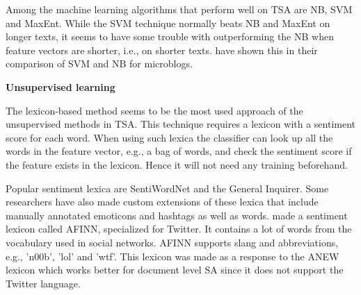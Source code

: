 Among the machine learning algorithms that perform well on TSA are NB, SVM and MaxEnt. While the SVM technique normally beats NB and MaxEnt on longer texts, it seems to have some trouble with outperforming the NB when feature vectors are shorter, i.e., on shorter texts. \cite{article:bermingham} have shown this in their comparison of SVM and NB for microblogs.\vspace{8 mm}

\noindent
\textbf{Unsupervised learning} \\
\noindent 

The lexicon-based method seems to be the most used approach of the unsupervised methods in TSA. This technique requires a lexicon with a sentiment score for each word. When using such lexica the classifier can look up all the words in the feature vector, e.g., a bag of words, and check the sentiment score if the feature exists in the lexicon. Hence it will not need any training beforehand.
	
Popular sentiment lexica are SentiWordNet and the General Inquirer. Some researchers have also made custom extensions of these lexica that include manually annotated emoticons and hashtags as well as words. \cite{article:afinn} made a sentiment lexicon called AFINN, specialized for Twitter. It contains a lot of words from the vocabulary used in social networks. AFINN supports slang and abbreviations, e.g., 'n00b', 'lol' and 'wtf'. This lexicon was made as a response to the ANEW lexicon which works better for document level SA since it does not support the Twitter language.